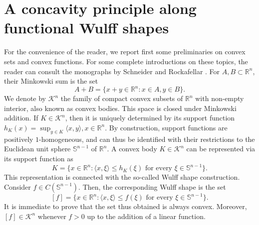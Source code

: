 \documentclass[a4paper, 11pt]{article}
\newcommand{\R}{\mathbb{R}}
\newcommand{\sph}{\mathbb{S}}
\newcommand{\K}{\mathcal{K}}
\theoremstyle{definition}
\begin{document}
\section{A concavity principle along functional Wulff shapes}

For the convenience of the reader, we report first some preliminaries on convex sets and convex functions. For some complete introductions on these topics, the reader can consult the monographs by Schneider \cite{SchneiderConvexBodiesBrunn2013} and Rockafellar \cite{RockafellarConvex1997}. For $A, B \subset \R^n$, their Minkowski sum is the set \[ A+B=\{ x+y \in \R^n: x\in A, y \in B\}.\] We denote by $\K^n$ the family of compact convex subsets of $\R^n$ with non-empty interior, also known as convex bodies. This space is closed under Minkowski addition. If $K \in \K^n$, then it is uniquely determined by its support function $h_K(x)=\sup_{y \in K} \langle x, y \rangle, x \in \R^n$. By construction, support functions are positively $1$-homogeneous, and can thus be identified with their restrictions to the Euclidean unit sphere $\sph^{n-1}$ of $\R^n$. A convex body $K \in \K^n$ can be represented via its support function as \[ K=\{x \in \R^n : \langle x,\xi \rangle \leq h_K(\xi) \text{ for every }\xi \in \sph^{n-1} \}.\] This representation is connected with the so-called Wulff shape construction. Consider $f \in C(\sph^{n-1})$. Then, the corresponding Wulff shape is the set \[ [f]=\{x \in \R^n: \langle x , \xi \rangle \leq f(\xi) \text{ for every }\xi \in \sph^{n-1} \}.\] It is immediate to prove that the set thus obtained is always convex. Moreover, $[f] \in \K^n$ whenever $f>0$ up to the addition of a linear function.
\end{document}
